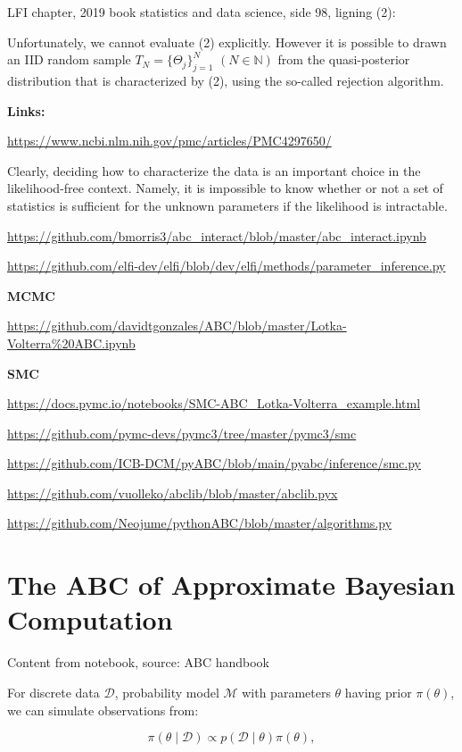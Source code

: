 LFI chapter, 2019 book statistics and data science, side 98, ligning (2): 

Unfortunately, we cannot evaluate (2) explicitly. However it is possible to drawn an IID random sample $T_N = \{ \Theta_j \}_{j=1}^N$ $(N \in \mathbb{N})$ from the quasi-posterior distribution that is characterized by (2), using the so-called rejection algorithm. 

\textbf{Links:}

\url{https://www.ncbi.nlm.nih.gov/pmc/articles/PMC4297650/}

Clearly, deciding how to characterize the data is an important choice in the likelihood-free context. Namely, it is impossible to know whether or not a set of statistics is sufficient for the unknown parameters if the likelihood is intractable.

\url{https://github.com/bmorris3/abc_interact/blob/master/abc_interact.ipynb}

\url{https://github.com/elfi-dev/elfi/blob/dev/elfi/methods/parameter_inference.py}

\textbf{MCMC} 

\url{https://github.com/davidtgonzales/ABC/blob/master/Lotka-Volterra%20ABC.ipynb}

\textbf{SMC} 

\url{https://docs.pymc.io/notebooks/SMC-ABC_Lotka-Volterra_example.html}

\url{https://github.com/pymc-devs/pymc3/tree/master/pymc3/smc}

\url{https://github.com/ICB-DCM/pyABC/blob/main/pyabc/inference/smc.py}

\url{https://github.com/vuolleko/abclib/blob/master/abclib.pyx}

\url{https://github.com/Neojume/pythonABC/blob/master/algorithms.py}


\section{The ABC of Approximate Bayesian Computation}\label{sec:abc_of_abc}

Content from notebook, source: ABC handbook

For discrete data $\mathcal{D}$, probability model $\mathcal{M}$ with parameters $\theta$ having prior $\pi(\theta)$, we can simulate observations from: 

\begin{equation}
    \pi (\theta \mid \mathcal{D}) \propto p(\mathcal{D} \mid \theta) \pi(\theta),
\end{equation}


